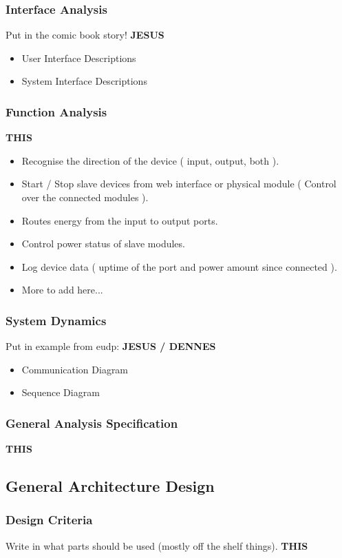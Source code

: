 	\subsubsection{Interface Analysis}
			Put in the comic book story!  \textbf{JESUS}
		\begin{itemize}
			\item User Interface Descriptions
				
			\item System Interface Descriptions
		\end{itemize}
	\subsubsection{Function Analysis}
	 \textbf{THIS}
		\begin{itemize}
			\item Recognise the direction of the device ( input, output, both ).
			\item Start / Stop slave devices from web interface or physical module ( Control over the connected modules ).
			\item Routes energy from the input to output ports.
			\item Control power status of slave modules.
			\item Log device data ( uptime of the port and power amount since connected ).
			\item More to add here...
		\end{itemize}
	\subsubsection{System Dynamics}
			Put in example from eudp: %
			 \textbf{JESUS / DENNES}
		\begin{itemize}
			\item Communication Diagram
			\item Sequence Diagram
		\end{itemize}
	\subsubsection{General Analysis Specification}
		 \textbf{THIS}
\subsection{General Architecture Design}
	\subsubsection{Design Criteria}
		Write in what parts should be used (mostly off the shelf things).  \textbf{THIS}
